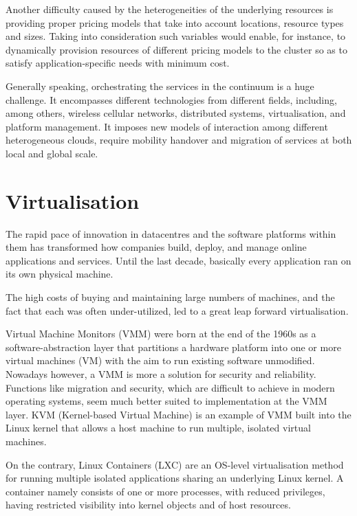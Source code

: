Another difficulty caused by the heterogeneities of the underlying resources is providing proper pricing models that take into account locations, resource types and sizes. Taking into consideration such variables would enable, for instance, to dynamically provision resources of different pricing models to the cluster so as to satisfy application-specific needs with minimum cost.

Generally speaking, orchestrating the services in the continuum is a huge challenge. It encompasses different technologies from different fields, including, among others, wireless cellular networks, distributed systems, virtualisation, and platform management. It imposes new models of interaction among different heterogeneous clouds, require mobility handover and migration of services at both local and global scale.

\section{Virtualisation}
\label{sec:virtualisation}

The rapid pace of innovation in datacentres and the software platforms within them has transformed how companies build, deploy, and manage online applications and services. Until the last decade, basically every application ran on its own physical machine.

The high costs of buying and maintaining large numbers of machines, and the fact that each was often under-utilized, led to a great leap forward virtualisation.

Virtual Machine Monitors (VMM) \cite{vmm} were born at the end of the 1960s as a software-abstraction layer that partitions a hardware platform into one or more virtual machines (VM) with the aim to run existing software unmodified. Nowadays however, a VMM is more a solution for security and reliability. Functions like migration and security, which are difficult to achieve in modern operating systems, seem much better suited to implementation at the VMM layer. KVM (Kernel-based Virtual Machine) \cite{kvm} is an example of VMM built into the Linux kernel that allows a host machine to run multiple, isolated virtual machines. 

On the contrary, Linux Containers (LXC) \cite{containers} are an OS-level virtualisation method for running multiple isolated applications sharing an underlying Linux kernel. A container namely consists of one or more processes, with reduced privileges, having restricted visibility into kernel objects and of host resources.

